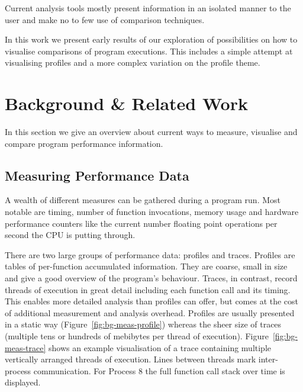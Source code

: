 \documentclass[b5paper, final, hauptseminar]{zih-template}
\newcommand*\cleartooddpage{
	\clearpage
	\ifthenelse{\isodd{\thepage}}
		{}
		{\newpage \mbox{} \clearpage}
}
\begin{document}
Current analysis tools mostly present information in an isolated manner to the user and make no to few use of comparison techniques.

In this work we present early results of our exploration of possibilities on how to visualise comparisons of program executions.
This includes a simple attempt at visualising profiles and a more complex variation on the profile theme.

\cleartooddpage
\section{Background \& Related Work}
In this section we give an overview about current ways to measure, visualise and compare program performance information.

\subsection{Measuring Performance Data}
A wealth of different measures can be gathered during a program run. Most notable are timing, number of function invocations, memory usage and hardware performance counters like the current number floating point operations per second the CPU is putting through.

There are two large groups of performance data: profiles and traces.
Profiles are tables of per-function accumulated information. They are coarse, small in size and give a good overview of the program's behaviour.
Traces, in contrast, record threads of execution in great detail including each function call and its timing.
This enables more detailed analysis than profiles can offer, but comes at the cost of additional measurement and analysis overhead.
Profiles are usually presented in a static way (Figure~\ref{fig:bg-meas-profile}) whereas the sheer size of traces (multiple tens or hundreds of mebibytes per thread of execution). Figure~\ref{fig:bg-meas-trace} shows an example visualisation of a trace containing multiple vertically arranged threads of execution. Lines between threads mark inter-process communication. For Process 8 the full function call stack over time is displayed.
\end{document}
